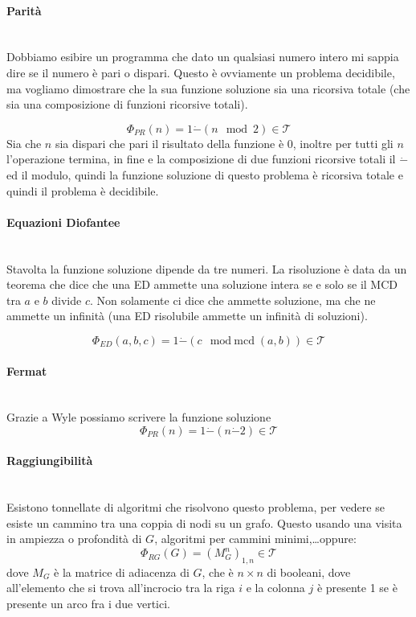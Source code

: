 \documentclass{article}
\begin{document}
\paragraph{Parità}\mbox{}\\
Dobbiamo esibire un programma che dato un qualsiasi numero intero mi sappia dire se il numero è
pari o dispari. Questo è ovviamente un problema decidibile, ma vogliamo dimostrare che la
sua funzione soluzione sia una ricorsiva totale (che sia una composizione di funzioni
ricorsive totali).

$$\Phi_{PR}(n)=1\dot{-}(n\mod{2}) \in\mathcal{T}$$
Sia che $n$ sia dispari che pari il risultato della funzione è 0, inoltre per tutti gli $n$
l'operazione termina, in fine e la composizione di due funzioni ricorsive totali il $\dot{-}$
ed il modulo, quindi la funzione soluzione di questo problema è ricorsiva totale e quindi
il problema è decidibile.

\paragraph{Equazioni Diofantee}\mbox{}\\
Stavolta la funzione soluzione dipende da tre numeri. La risoluzione
è data da un teorema che dice che una ED ammette una soluzione intera se e solo se il MCD
tra $a$ e $b$ divide $c$. Non solamente ci dice che ammette soluzione,
ma che ne ammette un infinità (una ED risolubile ammette un infinità di soluzioni).

$$\Phi_{ED}(a,b,c)=1\dot{-}(c\mod\text{mcd}(a,b))\in\mathcal{T}$$

\paragraph{Fermat}\mbox{}\\
Grazie a Wyle possiamo scrivere la funzione soluzione
$$\Phi_{PR}(n)=1\dot{-}(n\dot{-}2)\in\mathcal{T}$$

\paragraph{Raggiungibilità}\mbox{}\\
Esistono tonnellate di algoritmi che risolvono questo problema, per vedere se esiste
un cammino tra una coppia di nodi su un grafo. Questo usando una visita
in ampiezza o profondità di $G$, algoritmi per cammini minimi,\dots oppure:
$$\Phi_{RG}(G)=(M_G^n)_{1,n}\in\mathcal{T}$$
dove $M_G$ è la matrice di adiacenza di $G$, che è $n\times n$ di booleani, dove
all'elemento che si trova all'incrocio tra la riga $i$ e la colonna $j$ è presente
1 se è presente un arco fra i due vertici.
\end{document}
